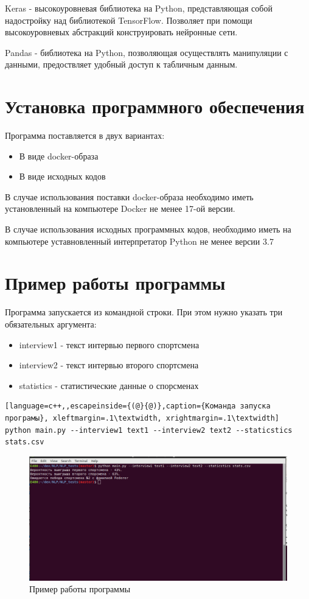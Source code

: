 Keras - высокоуровневая библиотека на Python, представляющая собой надостройку над библиотекой TensorFlow. Позволяет при помощи высокоуровневых абстракций конструировать нейронные сети.

Pandas - библиотека на Python, позволяющая осуществлять манипуляции с данными, предоствляет удобный доступ к табличным данным.
\section{Установка программного обеспечения}
Программа поставляется в двух вариантах:
\begin{itemize}
	\item В виде docker-образа
	\item В виде исходных кодов
\end{itemize}
В случае использования поставки docker-образа необходимо иметь установленный на компьютере Docker не менее 17-ой версии.

В случае использования исходных программных кодов, необходимо иметь на компьютере уставновленный интерпретатор Python не менее версии 3.7


\section{Пример работы программы}
Программа запускается из командной строки. При этом нужно указать три обязательных аргумента:
\begin{itemize}
	\item interview1 - текст интервью первого спортсмена
	\item interview2 - текст интервью второго спортсмена
	\item statistics - статистические данные о спорсменах
\end{itemize}
\bigskip
\bigskip
\bigskip
\bigskip
\bigskip
\bigskip
\bigskip
\begin{lstlisting}[language=c++,,escapeinside={(@}{@)},caption={Команда запуска програмы}, xleftmargin=.1\textwidth, xrightmargin=.1\textwidth] 
python main.py --interview1 text1 --interview2 text2 --staticstics stats.csv
\end{lstlisting}
\begin{figure}[]
	\centering
	\includegraphics[scale=0.5]{master_img/sample_program.png}
	\caption{Пример работы программы}
	\label{fig10}
\end{figure}